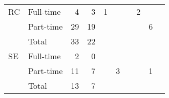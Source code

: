 \begin{table}[!htb]
\begin{list}{}{%
			\setlength{\leftmargin}{-2.5cm}
			\setlength{\rightmargin}{1.5cm}}
\begin{tabular}{*{2}{l}*{2}{r}*{6}{S}}
			\bottomrule
            		RC & Full-time & 4      & 3                                                                                      & 1                 &                    &                 & 2                   &                     &                     \\
			           & Part-time & 29     & 19                                                                                     &                   &                    &                 &                     & 6                   &                     \\
			           & Total     & 33     & 22                                                                                     &                   &                    &                 &                     &                     &                     \\
			\bottomrule
            		SE & Full-time &   2    &     0                                                                                  &                  &                    &                 &                    &                     &                     \\
			           & Part-time &  11    &  7                                                                                    &                   &    3                &                 &                     &   1                 &                     \\
			           & Total     &   13   &   7                                                                                   &                   &                    &                 &                     &                     &                     \\
			\bottomrule
		\end{tabular}
	\end{list}
\end{table}

